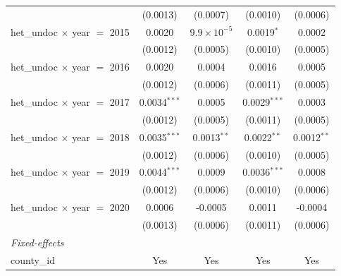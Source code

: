 \begin{tabular}{lcccc}
                                                   & (0.0013)           & (0.0007)                  & (0.0010)               & (0.0006)\\   
   het\_undoc $\times$ year $=$ 2015               & 0.0020             & $9.9\times 10^{-5}$       & 0.0019$^{*}$           & 0.0002\\   
                                                   & (0.0012)           & (0.0005)                  & (0.0010)               & (0.0005)\\   
   het\_undoc $\times$ year $=$ 2016               & 0.0020             & 0.0004                    & 0.0016                 & 0.0005\\   
                                                   & (0.0012)           & (0.0006)                  & (0.0011)               & (0.0005)\\   
   het\_undoc $\times$ year $=$ 2017               & 0.0034$^{***}$     & 0.0005                    & 0.0029$^{***}$         & 0.0003\\   
                                                   & (0.0012)           & (0.0005)                  & (0.0011)               & (0.0005)\\   
   het\_undoc $\times$ year $=$ 2018               & 0.0035$^{***}$     & 0.0013$^{**}$             & 0.0022$^{**}$          & 0.0012$^{**}$\\   
                                                   & (0.0012)           & (0.0006)                  & (0.0010)               & (0.0005)\\   
   het\_undoc $\times$ year $=$ 2019               & 0.0044$^{***}$     & 0.0009                    & 0.0036$^{***}$         & 0.0008\\   
                                                   & (0.0012)           & (0.0006)                  & (0.0010)               & (0.0006)\\   
   het\_undoc $\times$ year $=$ 2020               & 0.0006             & -0.0005                   & 0.0011                 & -0.0004\\   
                                                   & (0.0013)           & (0.0006)                  & (0.0011)               & (0.0006)\\   
   \midrule
   \emph{Fixed-effects}\\
   county\_id                                      & Yes                & Yes                       & Yes                    & Yes\\  

\end{tabular}
